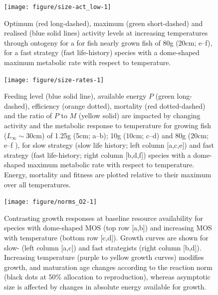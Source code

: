 \documentclass[11pt]{article}\usepackage[]{graphicx}\usepackage[]{color,soul}
\begin{document}
\begin{figure}[!ht]
{\centering 
\texttt{[image: figure/size-act\_low-1]} 
}
\caption[Optimum (red long-dashed), maximum (green short-dashed) and realised (blue solid lines) activity levels at increasing temperatures through ontogeny for a for fish nearly grown fish of 80g (20cm]{Optimum (red long-dashed), maximum (green short-dashed) and realised (blue solid lines) activity levels at increasing temperatures through ontogeny for a for fish nearly grown fish of 80g (20cm; e--f), for a fast strategy (fast life-history) species with a dome-shaped maximum metabolic rate with respect to temperature. }\label{fig:size-act_low}
\end{figure}

\begin{figure}[!ht]
{\centering 
\texttt{[image: figure/size-rates-1]} 
}
\caption[Feeding level (blue solid line), available energy $P$ (green long-dashed), efficiency (orange dotted), mortality (red dotted-dashed) and the ratio of $P$ to $M$ (yellow solid) are impacted by changing activity and the metabolic response to temperature for growing fish ($L_{\infty}\sim 30$cm) of 1.25g (5cm]{Feeding level (blue solid line), available energy $P$ (green long-dashed), efficiency (orange dotted), mortality (red dotted-dashed) and the ratio of $P$ to $M$ (yellow solid) are impacted by changing activity and the metabolic response to temperature for growing fish ($L_{\infty}\sim 30$cm) of 1.25g (5cm; a--b); 10g (10cm; c--d) and 80g (20cm; e--f ), for slow strategy (slow life history; left column [a,c,e]) and fast strategy (fast life-history; right column [b,d,f]) species with a dome-shaped maximum metabolic rate with respect to temperature. Energy, mortality and fitness are plotted relative to their maximum over all temperatures.}\label{fig:size-rates}
\end{figure}

\begin{figure}[!ht]
{\centering 
\texttt{[image: figure/norms\_O2-1]} 
}
\caption{Contrasting growth responses at baseline resource availability for species with dome-shaped MOS (top row [a,b]) and increasing MOS with temperature (bottom row [c,d]). Growth curves are shown for slow- (left column [a,c]) and fast strategists (right column [b,d]). Increasing temperature (purple to yellow growth curves) modifies growth, and maturation age changes according to the reaction norm (black dots at 50\% allocation to reproduction), whereas asymptotic size is affected by changes in absolute energy available for growth.}
\label{fig:norms_O2}
\end{figure}
\end{document}
